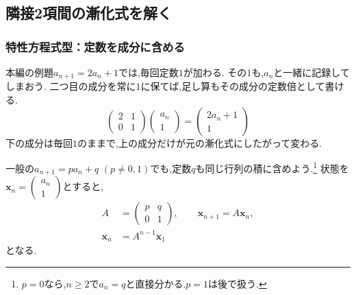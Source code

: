 \subsection{隣接2項間の漸化式を解く}\label{節：隣接2項間の漸化式を解く}

\subsubsection{特性方程式型：定数を成分に含める}
本編の例題$a_{n+1}=2a_n+1$では,毎回定数$1$が加わる.
その$1$も,$a_n$と一緒に記録してしまおう.
二つ目の成分を常に$1$に保てば,足し算もその成分の定数倍として書ける.
\[
  \begin{pmatrix}2&1\\0&1\end{pmatrix}
  \begin{pmatrix}a_n\\1\end{pmatrix}
  =\begin{pmatrix}2a_n+1\\1\end{pmatrix}
\]
下の成分は毎回$1$のままで,上の成分だけが元の漸化式にしたがって変わる.

一般の$a_{n+1}=pa_n+q$ $(p\ne0,1)$でも,定数$q$も同じ行列の積に含めよう.\footnote{$p=0$なら,$n\ge2$で$a_n=q$と直接分かる.$p=1$は後で扱う.}
状態を$\boldsymbol{x}_n=\begin{pmatrix}a_n\\1\end{pmatrix}$とすると,
\[
  \begin{aligned}
    A&=\begin{pmatrix}p&q\\0&1\end{pmatrix},\qquad
    \boldsymbol{x}_{n+1}=A\boldsymbol{x}_n,\\
    \boldsymbol{x}_n&=A^{n-1}\boldsymbol{x}_1
  \end{aligned}
\]
となる.

